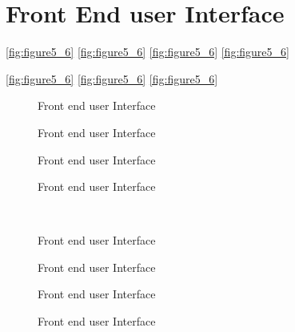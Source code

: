 \chapter{Front End user Interface}\doublespacing
\vspace*{0.5cm}
\vspace*{0.5cm}
\ref{fig:figure5_6}
\ref{fig:figure5_6}
\ref{fig:figure5_6}
\ref{fig:figure5_6}\par
\ref{fig:figure5_6}
\ref{fig:figure5_6}
\ref{fig:figure5_6}


\begin{figure}[ht]
    \caption{Front end user Interface}
    \caption{Front end user Interface}
    \caption{Front end user Interface}
    \caption{Front end user Interface}
    
\end{figure}
\begin{figure}[htbp]
    \raggedright %
    \includegraphics[width=0\textwidth]{Chapters/Chapter_7/images/veified.png}
    \caption{Front end user Interface}
    \caption{Front end user Interface}
    \caption{Front end user Interface}
    \caption{Front end user Interface}
    \label{fig:figure7_8}
    \end{figure}



% 
% 